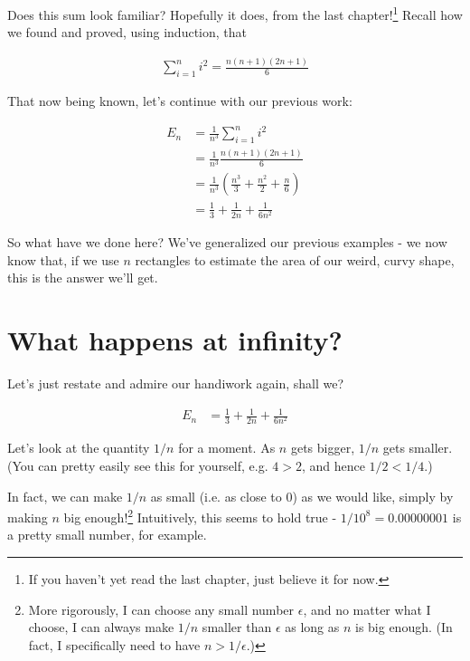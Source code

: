 \documentclass{article}
\begin{document}
Does this sum look familiar? Hopefully it does, from the last chapter!\footnote{If you haven't yet read the last chapter, just believe it for now.} Recall how we found and proved, using induction, that 

\begin{align*}
\sum_{i=1}^n i^2 = \frac{n(n+1)(2n+1)}{6}
\end{align*}

That now being known, let's continue with our previous work:


\begin{align*}
E_n &= \frac{1}{n^3} \sum_{i=1}^n i^2 \\
&= \frac{1}{n^3} \frac{n(n+1)(2n+1)}{6} \\
&= \frac{1}{n^3} \left( \frac{n^3}{3} + \frac{n^2}{2} + \frac{n}{6} \right) \\
&= \frac{1}{3} + \frac{1}{2n} + \frac{1}{6n^2}
\end{align*}

So what have we done here? We've generalized our previous examples - we now know that, if we use $n$ rectangles to estimate the area of our weird, curvy shape, this is the answer we'll get.



\section{What happens at infinity?}

Let's just restate and admire our handiwork again, shall we?


\begin{align*}
E_n &= \frac{1}{3} + \frac{1}{2n} + \frac{1}{6n^2}
\end{align*}

Let's look at the quantity $1/n$ for a moment. As $n$ gets bigger, $1/n$ gets smaller. (You can pretty easily see this for yourself, e.g. $4 > 2$, and hence $1/2 < 1/4$.) 

In fact, we can make $1/n$ as small (i.e. as close to 0) as we would like, simply by making $n$ big enough!\footnote{More rigorously, I can choose any small number $\epsilon$, and no matter what I choose, I can always make $1/n$ smaller than $\epsilon$ as long as $n$ is big enough. (In fact, I specifically need to have $n > 1/\epsilon$.)} Intuitively, this seems to hold true - $1/10^8 = 0.00000001$ is a pretty small number, for example.
\end{document}
